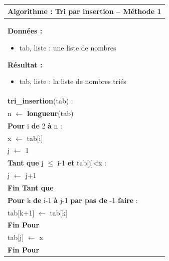\documentclass[10pt]{article}
\begin{document}
\begin{pseudo}
\begin{center}
\begin{tabular}{p{}}
\hline
\textbf{Algorithme :} Tri par insertion -- Méthode 1\\
\hline
\textbf{Données :}
\begin{itemize}
\item \textsf{tab}, liste : une liste de nombres
\end{itemize}
\textbf{Résultat :} 
\begin{itemize}
\item \textsf{tab}, liste : la liste de nombres triés
\end{itemize}
\\
\textbf{tri\_insertion}(\textsf{tab}) :\\
\hspace{.4cm} \textsf{n} $\leftarrow$ \textbf{longueur}(\textsf{tab}) \\
\hspace{.4cm}\textbf{Pour} \textsf{i} \textbf{de} 2 \textbf{à} \textsf{n} : \\
\hspace{.8cm} \textsf{x} $\leftarrow$ \textsf{tab[i]} \\
\hspace{.8cm} \textsf{j} $\leftarrow$ \textsf{1} \\
\hspace{.8cm}\textbf{Tant que} \textsf{j $\leq$ i-1} \textbf{et} \textsf{tab[j]<x}  : \\
\hspace{1.2cm} \textsf{j} $\leftarrow$ \textsf{j+1} \\
\hspace{.8cm}\textbf{Fin Tant que} \\
\hspace{.8cm}\textbf{Pour} \textsf{k} \textbf{de} \textsf{i-1} \textbf{à} \textsf{j-1} \textbf{par pas de} \textsf{-1} \textbf{faire} : \\
\hspace{1.2cm} \textsf{tab[k+1]} $\leftarrow$ \textsf{tab[k]} \\
\hspace{.8cm}\textbf{Fin Pour} \\
\hspace{.8cm} \textsf{tab[j]} $\leftarrow$ \textsf{x} \\
\hspace{.4cm}\textbf{Fin Pour} \\
\hline
\end{tabular}
\end{center}
\end{pseudo}
\end{document}
